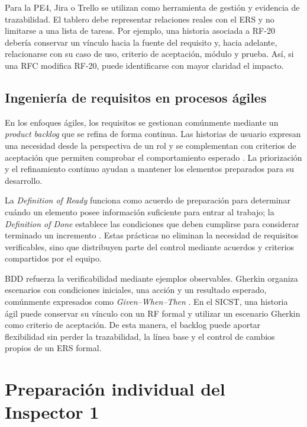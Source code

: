 \documentclass[12pt,a4paper]{article}
\newcommand{\Sigla}{SICST}
\begin{document}
Para la PE4, Jira o Trello se utilizan como herramienta de gestión y evidencia de trazabilidad. El tablero debe representar relaciones reales con el ERS y no limitarse a una lista de tareas. Por ejemplo, una historia asociada a RF-20 debería conservar un vínculo hacia la fuente del requisito y, hacia adelante, relacionarse con su caso de uso, criterio de aceptación, módulo y prueba. Así, si una RFC modifica RF-20, puede identificarse con mayor claridad el impacto.

\subsection{Ingeniería de requisitos en procesos ágiles}

En los enfoques ágiles, los requisitos se gestionan comúnmente mediante un \textit{product backlog} que se refina de forma continua. Las historias de usuario expresan una necesidad desde la perspectiva de un rol y se complementan con criterios de aceptación que permiten comprobar el comportamiento esperado \cite{r10}. La priorización y el refinamiento continuo ayudan a mantener los elementos preparados para su desarrollo.

La \textit{Definition of Ready} funciona como acuerdo de preparación para determinar cuándo un elemento posee información suficiente para entrar al trabajo; la \textit{Definition of Done} establece las condiciones que deben cumplirse para considerar terminado un incremento \cite{r8,r6}. Estas prácticas no eliminan la necesidad de requisitos verificables, sino que distribuyen parte del control mediante acuerdos y criterios compartidos por el equipo.

BDD refuerza la verificabilidad mediante ejemplos observables. Gherkin organiza escenarios con condiciones iniciales, una acción y un resultado esperado, comúnmente expresados como \textit{Given--When--Then} \cite{r11}. En el \Sigla{}, una historia ágil puede conservar su vínculo con un RF formal y utilizar un escenario Gherkin como criterio de aceptación. De esta manera, el backlog puede aportar flexibilidad sin perder la trazabilidad, la línea base y el control de cambios propios de un ERS formal.




\clearpage
\appendix
\section{Preparación individual del Inspector 1}
\end{document}
